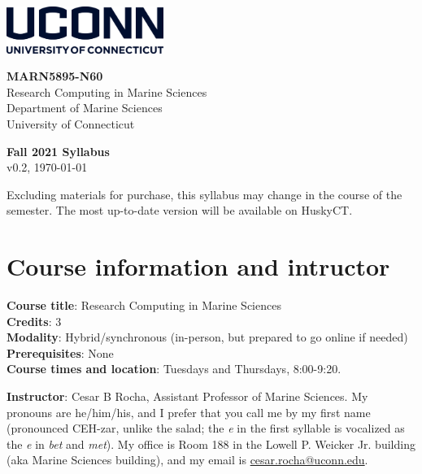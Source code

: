 \documentclass[11pt]{article}
\begin{document}
\parbox{.5\linewidth}
{
\begin{flushleft}
\includegraphics[height=0.6in]{uconn-wordmark-stacked-blue}\\
\vspace{1em}
\end{flushleft}
}
\parbox{.5\linewidth}
{
\begin{flushright}
{\bf MARN5895-N60 }\\
    Research Computing in Marine Sciences\\
    \vspace{.1cm}
{\footnotesize Department of Marine Sciences\\
University of Connecticut\\
}
\end{flushright}
}

\vspace{1em}

%
%
\begin{center}
\textbf{Fall 2021 Syllabus}\\
{\footnotesize v0.2, \today}
\end{center}
\vspace{-.6cm}
{\footnotesize Excluding materials for purchase, this syllabus may change in the course of the semester. The most up-to-date version will be available on HuskyCT.}

\section*{Course information and intructor}

\textbf{Course title}:  Research Computing in Marine Sciences\\
\textbf{Credits}:  3\\
\textbf{Modality}:  Hybrid/synchronous (in-person, but prepared to go online if needed)\\
\textbf{Prerequisites}:  None\\
\textbf{Course times and location}: Tuesdays and Thursdays, 8:00-9:20.

\bigskip

\textbf{Instructor}: Cesar B Rocha, Assistant Professor  of Marine Sciences. My
pronouns are he/him/his, and I prefer that you call me by my first name (pronounced
{CEH-zar}, unlike the salad; the \emph{e} in the first syllable is vocalized
as the \textit{e} in \emph{bet} and \emph{met}).  My office is Room 188 in the
Lowell P. Weicker Jr. building (aka Marine Sciences building), and my email is  \href{mailto:cesar.rocha@uconn.edu}{cesar.rocha@uconn.edu}.
\end{document}
